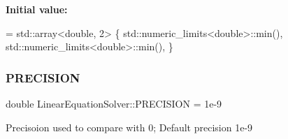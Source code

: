 {\bfseries Initial value\+:}
\begin{DoxyCode}
= std::array<double, 2>    \{
            std::numeric\_limits<double>::min(),
            std::numeric\_limits<double>::min(),
    \}
\end{DoxyCode}
\mbox{\label{namespaceLinearEquationSolver_a68d53d56e98cc83087dcfbc7e9b0ecc7}} 
\subsubsection{\texorpdfstring{P\+R\+E\+C\+I\+S\+I\+ON}{PRECISION}}
{\footnotesize\ttfamily double Linear\+Equation\+Solver\+::\+P\+R\+E\+C\+I\+S\+I\+ON = 1e-\/9}

Precisoion used to compare with 0; Default precision 1e-\/9 